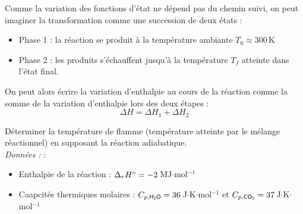 \documentclass[11pt,fleqn]{book} %
\begin{document}
Comme la variation des fonctions d'état ne dépend pas du chemin suivi, on peut imaginer la transformation comme une succession de deux états :
\begin{itemize}
    \item Phase 1 : la réaction se produit à la température ambiante $T_0 \approx 300$\,K
    \item Phase 2 : les produits s'échauffent jusqu'à la température $T_f$ atteinte dans l'état final.
\end{itemize}

On peut alors écrire la variation d'enthalpie au cours de la réaction comme la somme de la variation d'enthalpie lors des deux étapes :
\begin{equation}
    \Delta H = \Delta H_1 + \Delta H_2
\end{equation}

\begin{capex}
Déterminer la température de flamme (température atteinte par le mélange réactionnel) en supposant la réaction adiabatique.\\
\textit{Données :} : 
\begin{itemize}
\item Enthalpie de la réaction : $\Delta_r H\degree = -2\,$MJ$\cdot$mol$^{-1}$
\item Caapcités thermiques molaires : $C_{p,\ce{H2O}} = 36$\,J$\cdot$K$\cdot$mol$^{-1}$ et $C_{p,\ce{CO2}} = 37$\,J$\cdot$K$\cdot$mol$^{-1}$ 
\end{itemize}
\end{capex}
\end{document}

